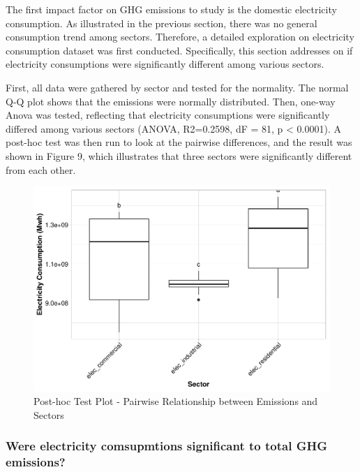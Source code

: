\documentclass[12pt,]{article}
\begin{document}
The first impact factor on GHG emissions to study is the domestic
electricity consumption. As illustrated in the previous section, there
was no general consumption trend among sectors. Therefore, a detailed
exploration on electricity consumption dataset was first conducted.
Specifically, this section addresses on if electricity consumptions were
significantly different among various sectors.

First, all data were gathered by sector and tested for the normality.
The normal Q-Q plot shows that the emissions were normally distributed.
Then, one-way Anova was tested, reflecting that electricity consumptions
were significantly differed among various sectors (ANOVA, R2=0.2598, dF
= 81, p \textless{} 0.0001). A post-hoc test was then run to look at the
pairwise differences, and the result was shown in Figure 9, which
illustrates that three sectors were significantly different from each
other.

\begin{figure}
\centering
\includegraphics{Project_Code_files/figure-latex/unnamed-chunk-25-1.pdf}
\caption{Post-hoc Test Plot - Pairwise Relationship between Emissions
and Sectors}
\end{figure}

\newpage

\subsubsection{Were electricity comsupmtions significant to total GHG
emissions?}\label{were-electricity-comsupmtions-significant-to-total-ghg-emissions}
\end{document}
